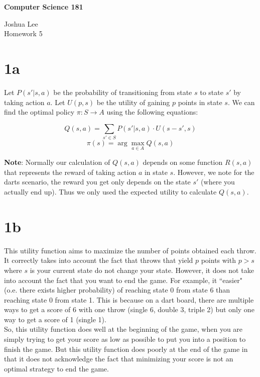 \documentclass[12pt]{article}
\begin{document}
\begin{center}
\large
\textbf{Computer Science 181} \\
\medskip

Joshua Lee\\
Homework 5\end{center}

\section{1a}
Let $P(s'|s,a)$ be the probability of transitioning from state $s$ to state $s'$ by taking action $a$. Let $U(p, s)$ be the utility of gaining $p$ points in state $s$. We can find the optimal policy $\pi: S \rightarrow A$ using the following equations:

$$Q(s,a) = \sum\limits_{s' \in S} P(s'|s,a) \cdot U(s-s',s) $$
$$\pi(s) = \arg\max\limits_{a \in A} Q(s,a)$$

\textbf{Note}: Normally our calculation of $Q(s,a)$ depends on some function $R(s,a)$ that represents the reward of taking action $a$ in state $s$. However, we note for the darts scenario, the reward you get only depends on the state $s'$ (where you actually end up). Thus we only used the expected utility to calculate $Q(s,a)$. \\

\section{1b}

This utility function aims to maximize the number of points obtained each throw. It correctly takes into account the fact that throws that yield $p$ points with $p > s$ where $s$ is your current state do not change your state. However, it does not take into account the fact that you want to end the game. For example, it ``easier" (o.e. there exists higher probability) of reaching state 0 from state 6 than reaching state 0 from state 1. This is because on a dart board, there are multiple ways to get a score of 6 with one throw (single 6, double 3, triple 2) but only one way to get a score of 1 (single 1).\\ 

So, this utility function does well at the beginning of the game, when you are simply trying to get your score as low as possible to put you into a position to finish the game. But this utility function does poorly at the end of the game in that it does not acknowledge the fact that minimizing your score is not an optimal strategy to end the game.
\end{document}
